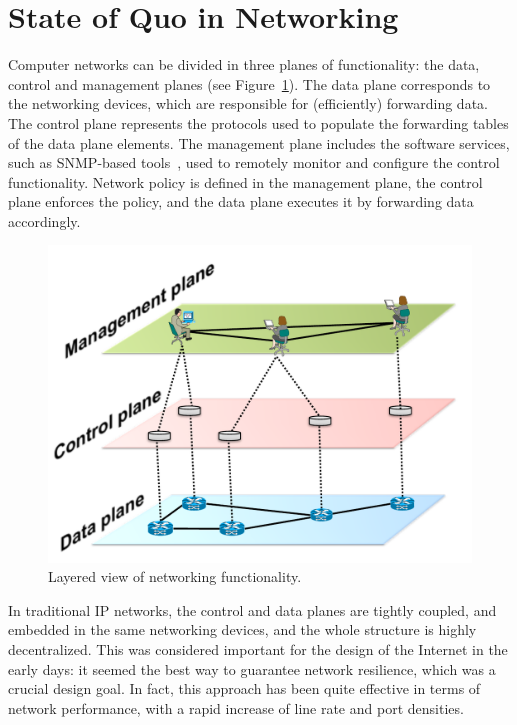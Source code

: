 \section{State of Quo in Networking}
\label{traditional_nets}

Computer networks can be divided in three planes of functionality: the
data, control and management planes (see Figure~\ref{fig:currentnetplanes}).  
The data plane corresponds to the networking devices, which are responsible 
for (efficiently) forwarding data.  The control plane represents the protocols 
used to populate the forwarding tables of the data plane elements. The management 
plane includes the software services, such as SNMP-based tools~\cite{presuhn2002}, 
used to remotely monitor and configure the control functionality.  Network policy 
is defined in the management plane, the control plane enforces the policy, and the 
data plane executes it by forwarding data accordingly.

\begin{figure}[t!]
\centering
\includegraphics[width=0.75\columnwidth]{figures/fig2_network_functionality.pdf}
\caption{Layered view of networking functionality.}
\label{fig:currentnetplanes}
\end{figure}

In traditional IP networks, the control and data planes are tightly coupled, and 
embedded in the same networking devices, and the whole structure is highly decentralized.
This was considered important for the design of the Internet in the early days: it seemed 
the best way to guarantee network resilience, which was a crucial design goal. In fact, 
this approach has been quite effective in terms of network performance, with a rapid 
increase of line rate and port densities.

